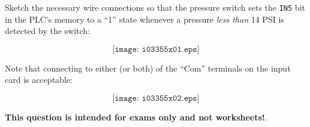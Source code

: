 

Sketch the necessary wire connections so that the pressure switch sets the {\tt IN5} bit in the PLC's memory to a ``1'' state whenever a pressure {\it less than} 14 PSI is detected by the switch:

$$\texttt{[image: i03355x01.eps]}$$







Note that connecting to either (or both) of the ``Com'' terminals on the input card is acceptable:

$$\texttt{[image: i03355x02.eps]}$$
 






{\bf This question is intended for exams only and not worksheets!}.



